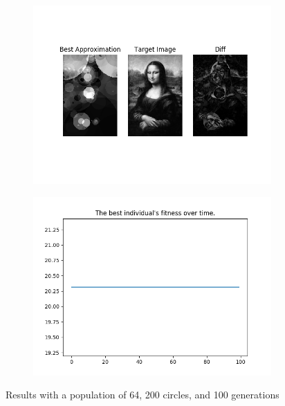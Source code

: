 \documentclass{article}
\begin{document}
\begin{figure}[H]
    \centering
    \begin{subfigure}[b]{0.45\textwidth}
        \centering
        \includegraphics[width=\textwidth]{output/ca-p64c200g100.png}
    \end{subfigure}
    \begin{subfigure}[b]{0.45\textwidth}
        \centering
        \includegraphics[width=\textwidth]{output/ca-p64c200g100-fitness.png}
    \end{subfigure}
    \caption{Results with a population of 64, 200 circles, and 100
        generations}\label{fig:ca-p64-c200-g100}
\end{figure}
\end{document}
